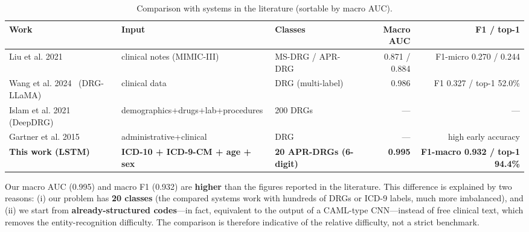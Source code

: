 \documentclass{ieeeaccess}
\begin{document}
\begin{table}[!t]
\caption{Comparison with systems in the literature (sortable by macro AUC).}
\label{tab:lit}
\scriptsize
\centering
\begin{tabular}{p{3.4cm}p{4.2cm}p{2.4cm}rr}
\hline
\textbf{Work} & \textbf{Input} & \textbf{Classes} & \textbf{Macro AUC} & \textbf{F1 / top-1} \\
\hline
Liu et al. 2021~\cite{b5} & clinical notes (MIMIC-III) & MS-DRG / APR-DRG & 0.871 / 0.884 & F1-micro 0.270 / 0.244 \\
Wang et al. 2024~\cite{b6} (DRG-LLaMA) & clinical data & DRG (multi-label) & 0.986 & F1 0.327 / top-1 52.0\% \\
Islam et al. 2021~\cite{b7} (DeepDRG) & demographics+drugs+lab+procedures & 200 DRGs & --- & --- \\
Gartner et al. 2015~\cite{b3} & administrative+clinical & DRG & --- & high early accuracy \\
\textbf{This work (LSTM)} & \textbf{ICD-10 + ICD-9-CM + age + sex} & \textbf{20 APR-DRGs (6-digit)} & \textbf{0.995} & \textbf{F1-macro 0.932 / top-1 94.4\%} \\
\hline
\end{tabular}
\end{table}

Our macro AUC (0.995) and macro F1 (0.932) are \textbf{higher} than the figures reported in the literature. This difference is explained by two reasons: (i) our problem has \textbf{20 classes} (the compared systems work with hundreds of DRGs or ICD-9 labels, much more imbalanced), and (ii) we start from \textbf{already-structured codes}---in fact, equivalent to the output of a CAML-type CNN---instead of free clinical text, which removes the entity-recognition difficulty. The comparison is therefore indicative of the relative difficulty, not a strict benchmark.
\end{document}
